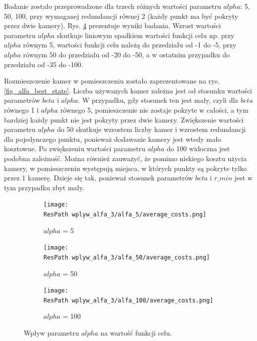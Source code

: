 \documentclass[12pt,a4paper]{article}
\newcommand{\ResPath}{../badania/}
\begin{document}
Badanie zostało przeprowadzone dla trzech różnych wartości parametru $alpha$: 5, 50, 100, przy wymaganej redundancji równej 2 (każdy punkt ma być pokryty przez dwie kamery).
Rys. \ref{fig_alfa} prezentuje wyniki badania. 
Wzrost wartości parametru $alpha$ skutkuje liniowym spadkiem wartości funkcji celu np. przy $alpha$ równym 5, wartości funkcji celu należą do przedziału od -1 do -5, przy $alpha$ równym 50 do przedziału od -20 do -50, a w ostatnim przypadku do przedziału od -35 do -100.

Rozmieszczenie kamer w pomieszczeniu zostało zaprezentowane na rys. \ref{fig_alfa_best_state}.
Liczba używanych kamer zależna jest od stosunku wartości parametrów $beta$ i $alpha$.
W przypadku, gdy stosunek ten jest mały, czyli dla $beta$ równego 1 i $alpha$ równego 5, pomieszczenie nie zostaje pokryte w całości, a tym bardziej każdy punkt nie jest
pokryty przez dwie kamery.
Zwiększenie wartości parametru $alpha$ do 50 skutkuje wzrostem liczby kamer
i wzrostem redundancji dla pojedynczego punktu, ponieważ dodawanie kamery jest
wtedy mało kosztowne.
Po zwiększeniu wartości parametru $alpha$ do 100 widoczna jest podobna zależność. Można również
zauważyć, że pomimo niskiego kosztu użycia kamery, w pomieszczeniu występują miejsca, w których punkty są pokryte tylko przez 1 kamerę. Dzieje się tak, ponieważ stosunek parametrów
$beta$ i $r\_min$ jest w tym przypadku zbyt mały.


\begin{figure}[htb]
  \begin{subfigure}[b]{0.5\linewidth}
    \centering
    \texttt{[image: \\ResPath wplyw\_alfa\_3/alfa\_5/average\_costs.png]}
    \caption{$alpha$ = 5}
    \label{fig_alfa:a}
    \vspace{2ex}
  \end{subfigure}%
  \begin{subfigure}[b]{0.5\linewidth}
    \texttt{[image: \\ResPath wplyw\_alfa\_3/alfa\_50/average\_costs.png]}
    \caption{$alpha$ = 50}
    \label{fig_alfa:b}
    \vspace{2ex}
  \end{subfigure}
  \begin{subfigure}[b]{0.5\linewidth}
    \centering
    \texttt{[image: \\ResPath wplyw\_alfa\_3/alfa\_100/average\_costs.png]}
    \caption{$alpha$ = 100}
    \label{fig_alfa:c}
  \end{subfigure}%

  \caption{Wpływ parametru $alpha$ na wartość funkcji celu.}
  \label{fig_alfa}
\end{figure}
\restoregeometry
\end{document}
